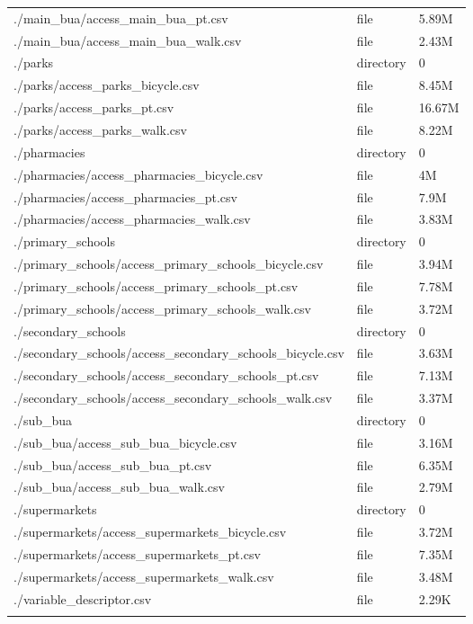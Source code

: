 \documentclass{article}
\begin{document}
\begin{longtable}[t]{>{\raggedright\arraybackslash}p{13cm}ll}
./main\_bua/access\_main\_bua\_pt.csv & file & 5.89M\\
./main\_bua/access\_main\_bua\_walk.csv & file & 2.43M\\
./parks & directory & 0\\
\addlinespace
./parks/access\_parks\_bicycle.csv & file & 8.45M\\
./parks/access\_parks\_pt.csv & file & 16.67M\\
./parks/access\_parks\_walk.csv & file & 8.22M\\
./pharmacies & directory & 0\\
./pharmacies/access\_pharmacies\_bicycle.csv & file & 4M\\
\addlinespace
./pharmacies/access\_pharmacies\_pt.csv & file & 7.9M\\
./pharmacies/access\_pharmacies\_walk.csv & file & 3.83M\\
./primary\_schools & directory & 0\\
./primary\_schools/access\_primary\_schools\_bicycle.csv & file & 3.94M\\
./primary\_schools/access\_primary\_schools\_pt.csv & file & 7.78M\\
\addlinespace
./primary\_schools/access\_primary\_schools\_walk.csv & file & 3.72M\\
./secondary\_schools & directory & 0\\
./secondary\_schools/access\_secondary\_schools\_bicycle.csv & file & 3.63M\\
./secondary\_schools/access\_secondary\_schools\_pt.csv & file & 7.13M\\
./secondary\_schools/access\_secondary\_schools\_walk.csv & file & 3.37M\\
\addlinespace
./sub\_bua & directory & 0\\
./sub\_bua/access\_sub\_bua\_bicycle.csv & file & 3.16M\\
./sub\_bua/access\_sub\_bua\_pt.csv & file & 6.35M\\
./sub\_bua/access\_sub\_bua\_walk.csv & file & 2.79M\\
./supermarkets & directory & 0\\
\addlinespace
./supermarkets/access\_supermarkets\_bicycle.csv & file & 3.72M\\
./supermarkets/access\_supermarkets\_pt.csv & file & 7.35M\\
./supermarkets/access\_supermarkets\_walk.csv & file & 3.48M\\
./variable\_descriptor.csv & file & 2.29K\\*
\end{longtable}
\endgroup{}
\end{document}

